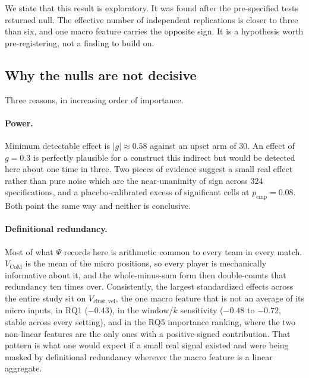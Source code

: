 \documentclass[11pt,a4paper]{article}
\newcommand{\Vcom}{V_{\mathrm{CoM}}}
\newcommand{\Vcv}{V_{\mathrm{clust,vel}}}
\begin{document}
We state that this result is exploratory. It was found after the pre-specified
tests returned null. The effective number of independent replications is closer to three
than six, and one macro feature carries the opposite sign. It is a hypothesis worth
pre-registering, not a finding to build on.

\subsection{Why the nulls are not decisive}

Three reasons, in increasing order of importance.

\paragraph{Power.} Minimum detectable effect is $|g|\approx0.58$ against an upset arm of 30.
An effect of $g=0.3$ is perfectly plausible for a construct this indirect but would be
detected here about one time in three. Two pieces of evidence suggest a small real effect
rather than pure noise which are the near-unanimity of sign across 324 specifications, and a
placebo-calibrated excess of significant cells at $p_{\text{emp}}=0.08$. Both point the same way and neither is conclusive.

\paragraph{Definitional redundancy.} Most of what $\Psi$ records here is arithmetic common
to every team in every match. $\Vcom$ is the mean of the micro positions, so every player
is mechanically informative about it, and the whole-minus-sum form then double-counts that
redundancy ten times over. Consistently, the largest standardized effects across the entire
study sit on $\Vcv$, the one macro feature that is not an average of its micro inputs, in RQ1 ($-0.43$), in the window/$k$ sensitivity ($-0.48$ to $-0.72$, stable across
every setting), and in the RQ5 importance ranking, where the two non-linear features are
the only ones with a positive-signed contribution. That pattern is what one would expect if
a small real signal existed and were being masked by definitional redundancy wherever the
macro feature is a linear aggregate.
\end{document}
